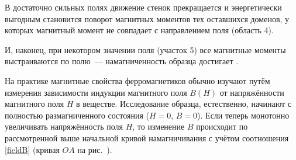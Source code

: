 
В достаточно сильных полях движение стенок прекращается и энергетически
выгодным становится поворот магнитных моментов тех оставшихся доменов, у которых
магнитный момент не совпадает с направлением поля (область 4).

И, наконец, при некотором значении поля (участок 5) все магнитные моменты
выстраиваются по полю~--- намагниченность образца достигает .

%
%
%
%
%

На практике магнитные свойства ферромагнетиков обычно изучают путём измерения
зависимости индукции магнитного поля $B(H)$ от напряжённости магнитного поля $H$ в
веществе. Исследование образца, естественно, начинают с полностью
размагниченного состояния ($H = 0$, $B = 0$). Если теперь монотонно увеличивать
напряжённость поля $H$, то изменение $B$ происходит по рассмотренной выше
начальной кривой намагничивания с учётом соотношения \eqref{fieldB}
(кривая $OA$ на рис.~).

